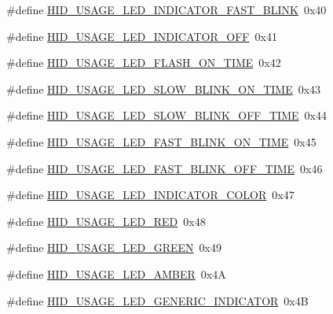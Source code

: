 \begin{DoxyCompactItemize}
\item 
\#define \hyperlink{group___u_s_b_d___h_i_d_ga539ee008fdc26641e2ea9b2fb0065ab8}{H\+I\+D\+\_\+\+U\+S\+A\+G\+E\+\_\+\+L\+E\+D\+\_\+\+I\+N\+D\+I\+C\+A\+T\+O\+R\+\_\+\+F\+A\+S\+T\+\_\+\+B\+L\+I\+NK}~0x40
\item 
\#define \hyperlink{group___u_s_b_d___h_i_d_ga9b2b1678ab1dc53fea10cb0bf9d5ceb6}{H\+I\+D\+\_\+\+U\+S\+A\+G\+E\+\_\+\+L\+E\+D\+\_\+\+I\+N\+D\+I\+C\+A\+T\+O\+R\+\_\+\+O\+FF}~0x41
\item 
\#define \hyperlink{group___u_s_b_d___h_i_d_gad942590ef85818bacfbaa0655e0ed269}{H\+I\+D\+\_\+\+U\+S\+A\+G\+E\+\_\+\+L\+E\+D\+\_\+\+F\+L\+A\+S\+H\+\_\+\+O\+N\+\_\+\+T\+I\+ME}~0x42
\item 
\#define \hyperlink{group___u_s_b_d___h_i_d_gad36a76b56e9907632d47d5c41fb9532a}{H\+I\+D\+\_\+\+U\+S\+A\+G\+E\+\_\+\+L\+E\+D\+\_\+\+S\+L\+O\+W\+\_\+\+B\+L\+I\+N\+K\+\_\+\+O\+N\+\_\+\+T\+I\+ME}~0x43
\item 
\#define \hyperlink{group___u_s_b_d___h_i_d_ga3a9ec4aee050a3345dab774f559f06b6}{H\+I\+D\+\_\+\+U\+S\+A\+G\+E\+\_\+\+L\+E\+D\+\_\+\+S\+L\+O\+W\+\_\+\+B\+L\+I\+N\+K\+\_\+\+O\+F\+F\+\_\+\+T\+I\+ME}~0x44
\item 
\#define \hyperlink{group___u_s_b_d___h_i_d_ga29edc17f7621d8e8ae6784719a8fc0d3}{H\+I\+D\+\_\+\+U\+S\+A\+G\+E\+\_\+\+L\+E\+D\+\_\+\+F\+A\+S\+T\+\_\+\+B\+L\+I\+N\+K\+\_\+\+O\+N\+\_\+\+T\+I\+ME}~0x45
\item 
\#define \hyperlink{group___u_s_b_d___h_i_d_gabe40d382c5e3c869915e538ccfc41852}{H\+I\+D\+\_\+\+U\+S\+A\+G\+E\+\_\+\+L\+E\+D\+\_\+\+F\+A\+S\+T\+\_\+\+B\+L\+I\+N\+K\+\_\+\+O\+F\+F\+\_\+\+T\+I\+ME}~0x46
\item 
\#define \hyperlink{group___u_s_b_d___h_i_d_gadb3da176f60220a7a4e144951a9d3f04}{H\+I\+D\+\_\+\+U\+S\+A\+G\+E\+\_\+\+L\+E\+D\+\_\+\+I\+N\+D\+I\+C\+A\+T\+O\+R\+\_\+\+C\+O\+L\+OR}~0x47
\item 
\#define \hyperlink{group___u_s_b_d___h_i_d_ga780c86a3c9ba4067b65eb433ac1f8969}{H\+I\+D\+\_\+\+U\+S\+A\+G\+E\+\_\+\+L\+E\+D\+\_\+\+R\+ED}~0x48
\item 
\#define \hyperlink{group___u_s_b_d___h_i_d_gaf8c1b2eabce7c6de2d1ac4a42e0ff14e}{H\+I\+D\+\_\+\+U\+S\+A\+G\+E\+\_\+\+L\+E\+D\+\_\+\+G\+R\+E\+EN}~0x49
\item 
\#define \hyperlink{group___u_s_b_d___h_i_d_gafaf2aa31520e8770dccaa59823f8f991}{H\+I\+D\+\_\+\+U\+S\+A\+G\+E\+\_\+\+L\+E\+D\+\_\+\+A\+M\+B\+ER}~0x4A
\item 
\#define \hyperlink{group___u_s_b_d___h_i_d_ga143b6421daaa592826a0e79f01d807a5}{H\+I\+D\+\_\+\+U\+S\+A\+G\+E\+\_\+\+L\+E\+D\+\_\+\+G\+E\+N\+E\+R\+I\+C\+\_\+\+I\+N\+D\+I\+C\+A\+T\+OR}~0x4B
\end{DoxyCompactItemize}
